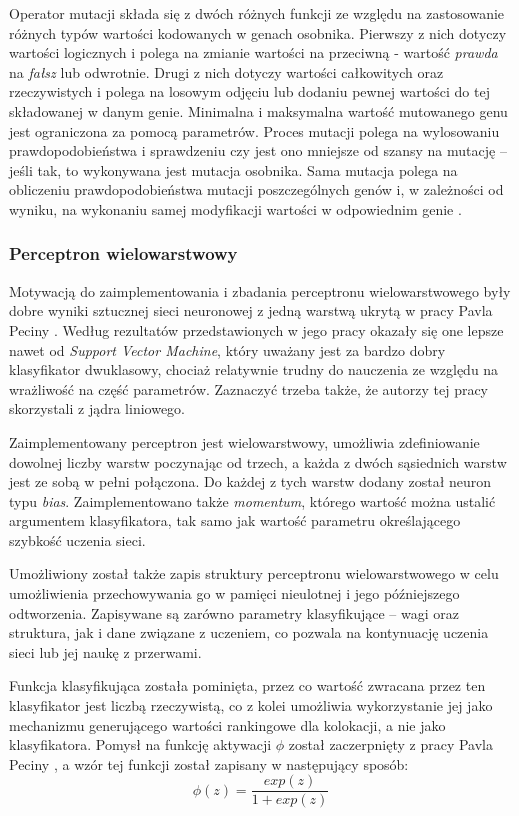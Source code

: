 \par 
Operator mutacji składa się z dwóch różnych funkcji ze względu na zastosowanie różnych typów wartości kodowanych w genach osobnika.
Pierwszy z nich dotyczy wartości logicznych i polega na zmianie wartości na przeciwną - wartość \emph{prawda} na \emph{fałsz} lub odwrotnie.
Drugi z nich dotyczy wartości całkowitych oraz rzeczywistych i polega na losowym odjęciu lub dodaniu pewnej wartości do tej składowanej w danym genie.
Minimalna i maksymalna wartość mutowanego genu jest ograniczona za pomocą parametrów.
Proces mutacji polega na wylosowaniu prawdopodobieństwa i sprawdzeniu czy jest ono mniejsze od szansy na mutację -- jeśli tak, to wykonywana jest mutacja osobnika.
Sama mutacja polega na obliczeniu prawdopodobieństwa mutacji poszczególnych genów i, w zależności od wyniku, na wykonaniu samej modyfikacji wartości w odpowiednim genie \cite[str. 31]{klyk}.


\subsubsection{Perceptron wielowarstwowy}
Motywacją do zaimplementowania i zbadania perceptronu wielowarstwowego były dobre wyniki sztucznej sieci neuronowej z jedną warstwą ukrytą w pracy Pavla Peciny \cite{coling}.
Według rezultatów przedstawionych w jego pracy okazały się one lepsze nawet od \emph{Support Vector Machine}, który uważany jest za bardzo dobry klasyfikator dwuklasowy, chociaż relatywnie trudny do nauczenia ze względu na wrażliwość na część parametrów.
Zaznaczyć trzeba także, że autorzy tej pracy skorzystali z jądra liniowego.

\par
Zaimplementowany perceptron jest wielowarstwowy, umożliwia zdefiniowanie dowolnej liczby warstw poczynając od trzech, a każda z dwóch sąsiednich warstw jest ze sobą w pełni połączona.
Do każdej z tych warstw dodany został neuron typu \emph{bias}. 
Zaimplementowano także \emph{momentum}, którego wartość można ustalić argumentem klasyfikatora, tak samo jak wartość parametru określającego szybkość uczenia sieci.
\par
Umożliwiony został także zapis struktury perceptronu wielowarstwowego w celu umożliwienia przechowywania go w pamięci nieulotnej i jego późniejszego odtworzenia.
Zapisywane są zarówno parametry klasyfikujące -- wagi oraz struktura, jak i dane związane z uczeniem, co pozwala na kontynuację uczenia sieci lub jej naukę z przerwami.

\par
Funkcja klasyfikująca została pominięta, przez co wartość zwracana przez ten klasyfikator jest liczbą rzeczywistą, co z kolei umożliwia wykorzystanie jej jako mechanizmu generującego wartości rankingowe dla kolokacji, a nie jako klasyfikatora.
Pomysł na funkcję aktywacji \( \phi \) został zaczerpnięty z pracy Pavla Peciny \cite{coling}, a wzór tej funkcji został zapisany w następujący sposób:
$$ \phi(z) = \frac{exp(z)}{1 + exp(z)} $$

